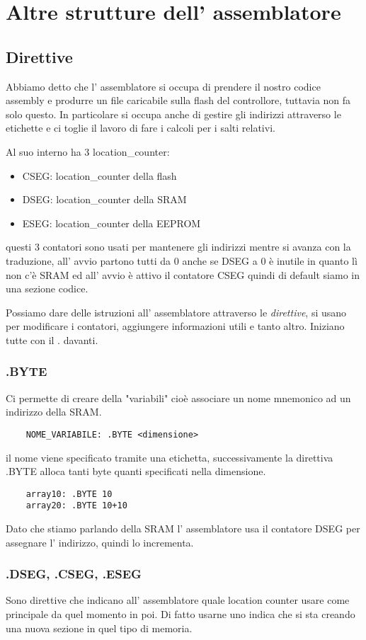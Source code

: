 \section{Altre strutture dell' assemblatore}
\subsection{Direttive}
Abbiamo detto che l' assemblatore si occupa di prendere il nostro codice assembly e produrre un file caricabile sulla flash del controllore, tuttavia non fa solo questo.
In particolare si occupa anche di gestire gli indirizzi attraverso le etichette e ci toglie il lavoro di fare i calcoli per i salti relativi.

Al suo interno ha 3 location\_counter:
\begin{itemize}
    \item CSEG: location\_counter della flash
    \item DSEG: location\_counter della SRAM
    \item ESEG: location\_counter della EEPROM
\end{itemize}
questi 3 contatori sono usati per mantenere gli indirizzi mentre si avanza con la traduzione, all' avvio partono tutti da 0 anche se DSEG a 0 è inutile in quanto lì non c'è SRAM ed all' avvio è attivo il contatore CSEG quindi di default siamo in una sezione codice.

Possiamo dare delle istruzioni all' assemblatore attraverso le \emph{direttive}, si usano per modificare i contatori, aggiungere informazioni utili e tanto altro.
Iniziano tutte con il . davanti.

\subsubsection{.BYTE}
Ci permette di creare della "variabili" cioè associare un nome mnemonico ad un indirizzo della SRAM.
\begin{verbatim}
    NOME_VARIABILE: .BYTE <dimensione>
\end{verbatim}
il nome viene specificato tramite una etichetta, successivamente la direttiva .BYTE alloca tanti byte quanti specificati nella dimensione.
\begin{verbatim}
    array10: .BYTE 10
    array20: .BYTE 10+10
\end{verbatim}
Dato che stiamo parlando della SRAM l' assemblatore usa il contatore DSEG per assegnare l' indirizzo, quindi lo incrementa.

\subsubsection{.DSEG, .CSEG, .ESEG}
Sono direttive che indicano all' assemblatore quale location counter usare come principale da quel momento in poi.
Di fatto usarne uno indica che si sta creando una nuova sezione in quel tipo di memoria.


